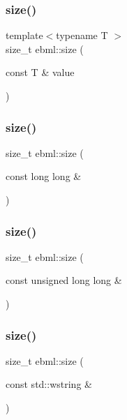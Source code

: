 \mbox{\label{namespaceebml_a0385005834de08a2401ec491023f9ab3}} 
\subsubsection{\texorpdfstring{size()}{size()}\hspace{0.1cm}{\footnotesize\ttfamily [1/8]}}
{\footnotesize\ttfamily template$<$typename T $>$ \\
size\+\_\+t ebml\+::size (\begin{DoxyParamCaption}\item[{const T \&}]{value }\end{DoxyParamCaption})}

\mbox{\label{namespaceebml_a54b33809097f683fb8345f9668e8237b}} 
\subsubsection{\texorpdfstring{size()}{size()}\hspace{0.1cm}{\footnotesize\ttfamily [2/8]}}
{\footnotesize\ttfamily size\+\_\+t ebml\+::size (\begin{DoxyParamCaption}\item[{const long long \&}]{ }\end{DoxyParamCaption})}

\mbox{\label{namespaceebml_a6e2cf9e4800e8a09b5f4cb8de613ad77}} 
\subsubsection{\texorpdfstring{size()}{size()}\hspace{0.1cm}{\footnotesize\ttfamily [3/8]}}
{\footnotesize\ttfamily size\+\_\+t ebml\+::size (\begin{DoxyParamCaption}\item[{const unsigned long long \&}]{ }\end{DoxyParamCaption})}

\mbox{\label{namespaceebml_ab52135bc5dd3c3195dfc839bc8b551fd}} 
\subsubsection{\texorpdfstring{size()}{size()}\hspace{0.1cm}{\footnotesize\ttfamily [4/8]}}
{\footnotesize\ttfamily size\+\_\+t ebml\+::size (\begin{DoxyParamCaption}\item[{const std\+::wstring \&}]{ }\end{DoxyParamCaption})}

